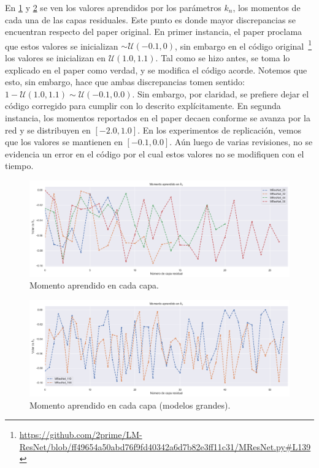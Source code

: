\documentclass[titlepage,a4paper,oneside]{article}
\begin{document}
En \ref{momentum} y \ref{momentum_large} se ven los valores aprendidos por los parámetros $k_n$, los momentos de cada una de las capas residuales. Este punto es donde mayor discrepancias se encuentran respecto del paper original. En primer instancia, el paper proclama que estos valores se inicializan $\sim \mathscr{U}(-0.1, 0)$, sin embargo en el código original~\footnote{\url{https://github.com/2prime/LM-ResNet/blob/ff49654a50abd76f9fd40342a6d7b82e3ff11c31/MResNet.py\#L139}} los valores se inicializan en $\mathscr{U}(1.0, 1.1)$. Tal como se hizo antes, se toma lo explicado en el paper como verdad, y se modifica el código acorde. Notemos que esto, sin embargo, hace que ambas discrepancias tomen sentido: $1 - \mathscr{U}(1.0, 1.1) \sim \mathscr{U}(-0.1, 0.0)$. Sin embargo, por claridad, se prefiere dejar el código corregido para cumplir con lo descrito explícitamente. En segunda instancia, los momentos reportados en el paper decaen conforme se avanza por la red y se distribuyen en $\left[-2.0, 1.0\right]$. En los experimentos de replicación, vemos que los valores se mantienen en $\left[-0.1, 0.0\right]$. Aún luego de varias revisiones, no se evidencia un error en el código por el cual estos valores no se modifiquen con el tiempo.

\begin{figure}[H]
\centering
\includegraphics[width=\textwidth]{images/momentum.png}
\caption{Momento aprendido en cada capa.}
\label{momentum}
\end{figure}

\begin{figure}[H]
\centering
\includegraphics[width=\textwidth]{images/momentum_large.png}
\caption{Momento aprendido en cada capa (modelos grandes).}
\label{momentum_large}
\end{figure}
\end{document}
